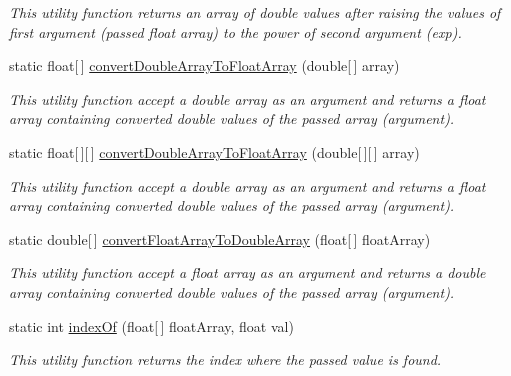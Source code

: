 \begin{DoxyCompactItemize}
\begin{DoxyCompactList}\small\item\em This utility function returns an array of double values after raising the values of first argument (passed float array) to the power of second argument (exp). \end{DoxyCompactList}\item 
static float\mbox{[}$\,$\mbox{]} \hyperlink{classuk_1_1ac_1_1dmu_1_1iesd_1_1cascade_1_1util_1_1_array_utils_a137838b8f342da5968c84a88ec0a63f7}{convert\-Double\-Array\-To\-Float\-Array} (double\mbox{[}$\,$\mbox{]} array)
\begin{DoxyCompactList}\small\item\em This utility function accept a double array as an argument and returns a float array containing converted double values of the passed array (argument). \end{DoxyCompactList}\item 
static float\mbox{[}$\,$\mbox{]}\mbox{[}$\,$\mbox{]} \hyperlink{classuk_1_1ac_1_1dmu_1_1iesd_1_1cascade_1_1util_1_1_array_utils_aa6443e6fd05584c2aafdc86dff32ff65}{convert\-Double\-Array\-To\-Float\-Array} (double\mbox{[}$\,$\mbox{]}\mbox{[}$\,$\mbox{]} array)
\begin{DoxyCompactList}\small\item\em This utility function accept a double array as an argument and returns a float array containing converted double values of the passed array (argument). \end{DoxyCompactList}\item 
static double\mbox{[}$\,$\mbox{]} \hyperlink{classuk_1_1ac_1_1dmu_1_1iesd_1_1cascade_1_1util_1_1_array_utils_aa069a7b7065554e7ab59a45c55c8b763}{convert\-Float\-Array\-To\-Double\-Array} (float\mbox{[}$\,$\mbox{]} float\-Array)
\begin{DoxyCompactList}\small\item\em This utility function accept a float array as an argument and returns a double array containing converted double values of the passed array (argument). \end{DoxyCompactList}\item 
static int \hyperlink{classuk_1_1ac_1_1dmu_1_1iesd_1_1cascade_1_1util_1_1_array_utils_a2dbf2f54bdb44a8d759d88cd5a4c8740}{index\-Of} (float\mbox{[}$\,$\mbox{]} float\-Array, float val)
\begin{DoxyCompactList}\small\item\em This utility function returns the index where the passed value is found. \end{DoxyCompactList}\item 

\end{DoxyCompactItemize}
